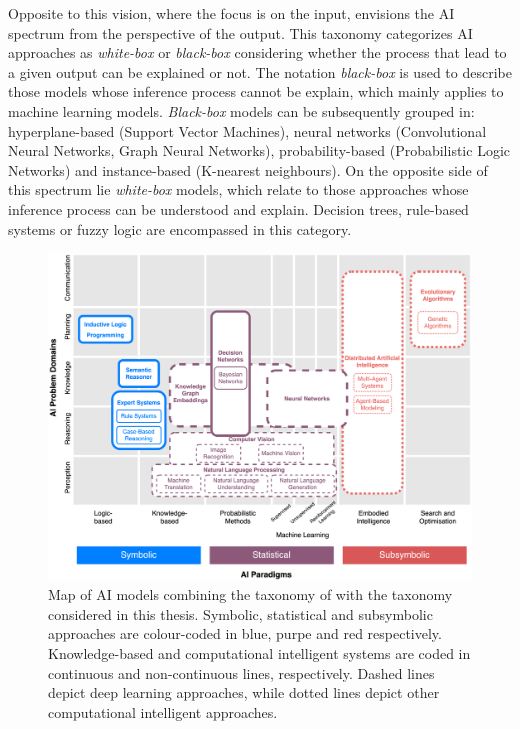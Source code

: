 Opposite to this vision, where the focus is on the input, \cite{loyola-gonzalez_black-box_2019} envisions the AI spectrum from the perspective of the output. This taxonomy categorizes AI approaches as \textit{white-box} or \textit{black-box} considering whether the process that lead to a given output can be explained or not. The notation \textit{black-box} is used to describe those models whose inference process cannot be explain, which mainly applies to machine learning models.  \textit{Black-box} models can be subsequently grouped in: hyperplane-based (Support Vector Machines), neural networks (Convolutional Neural Networks, Graph Neural Networks), probability-based (Probabilistic Logic Networks) and instance-based (K-nearest neighbours). On the opposite side of this spectrum lie \textit{white-box} models, which relate to those approaches whose inference process can be understood and explain. Decision trees, rule-based systems or fuzzy logic are encompassed in this category.


\begin{figure}
    \centering
    \includegraphics[width=\linewidth]{3_stateoftheart/figures/AI_Map.eps}
    \caption{Map of AI models combining the taxonomy of \cite{corea_ai_2019} with the taxonomy considered in this thesis. Symbolic, statistical and subsymbolic approaches are colour-coded in blue, purpe and red respectively. Knowledge-based and computational intelligent systems are coded in continuous and non-continuous lines, respectively. Dashed lines depict deep learning approaches, while dotted lines depict other computational intelligent approaches.}
    \label{fig:ai_map}
\end{figure}


